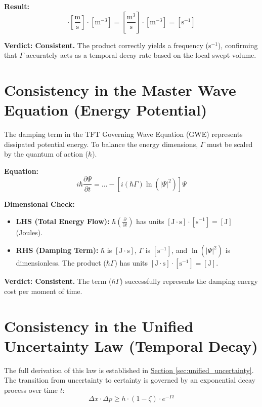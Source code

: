 \textbf{Result:}
\begin{equation}
    [\text{m}^2] \cdot \left[\frac{\text{m}}{\text{s}}\right] \cdot [\text{m}^{-3}] = \left[\frac{\text{m}^3}{\text{s}}\right] \cdot [\text{m}^{-3}] = [\text{s}^{-1}]
\end{equation}

\textbf{Verdict: Consistent.} The product correctly yields a frequency ($\text{s}^{-1}$), confirming that $\Gamma$ accurately acts as a temporal decay rate based on the local swept volume.

\section{Consistency in the Master Wave Equation (Energy Potential)}
The damping term in the TFT Governing Wave Equation (GWE) represents dissipated potential energy. To balance the energy dimensions, $\Gamma$ must be scaled by the quantum of action ($\hbar$).

\textbf{Equation:}
\begin{equation}
    i\hbar \frac{\partial\Psi}{\partial t} = \dots - \left[i(\hbar\Gamma)\ln(|\Psi|^2)\right]\Psi
\end{equation}

\textbf{Dimensional Check:}
\begin{itemize}
    \item \textbf{LHS (Total Energy Flow):} $\hbar \left(\frac{\partial}{\partial t}\right)$ has units $[\text{J}\cdot\text{s}] \cdot [\text{s}^{-1}] = [\text{J}]$ (Joules).
    \item \textbf{RHS (Damping Term):} $\hbar$ is $[\text{J}\cdot\text{s}]$, $\Gamma$ is $[\text{s}^{-1}]$, and $\ln(|\Psi|^2)$ is dimensionless. The product ($\hbar\Gamma$) has units $[\text{J}\cdot\text{s}] \cdot [\text{s}^{-1}] = [\text{J}]$.
\end{itemize}

\textbf{Verdict: Consistent.} The term ($\hbar\Gamma$) successfully represents the damping energy cost per moment of time.

\section{Consistency in the Unified Uncertainty Law (Temporal Decay)}
The full derivation of this law is established in \hyperref[sec:unified_uncertainty]{Section \ref*{sec:unified_uncertainty}}. The transition from uncertainty to certainty is governed by an exponential decay process over time $t$:
\begin{equation}
    \Delta x \cdot \Delta p \geq h \cdot (1-\zeta) \cdot e^{-\Gamma t}
\end{equation}

